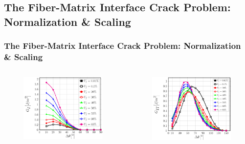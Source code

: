 \documentclass[first,firstsupp,lastsupp,last,hyperref,table]{ETHclass}
\begin{document}
\subsection[Normalization \& Scaling]{The Fiber-Matrix Interface Crack Problem: Normalization \& Scaling}

\begin{frame}
\frametitle{\vspace{0.3cm}\small The Fiber-Matrix Interface Crack Problem: Normalization \& Scaling}
\vspace{-1.cm}
\centering
\begin{columns}[c]
\begin{column}{0.5\textwidth}
\begin{figure}
\includegraphics[width=\columnwidth]{GI-free-dim.pdf}
\end{figure}
\end{column}
\begin{column}{0.5\textwidth}
\begin{figure}
\includegraphics[width=\columnwidth]{GII-free-dim.pdf}

\end{figure}
\end{column}
\end{columns}
\end{frame}
\end{document}
